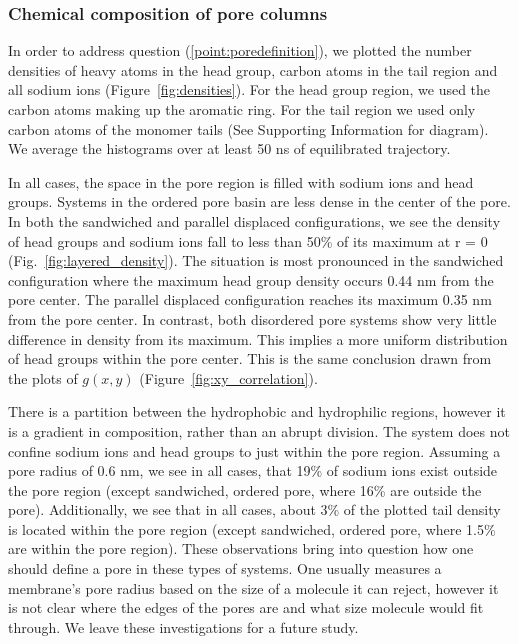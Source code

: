 \documentclass[journal=jpcbfk,manusciprt=article]{achemso}
\begin{document}
  \subsubsection{Chemical composition of pore columns}

  In order to address question (\ref{point:poredefinition}), we plotted the
  number densities of heavy atoms in the head group, carbon atoms in the tail
  region and all sodium ions (Figure~\ref{fig:densities}). For the head group
  region, we used the carbon atoms making up the aromatic ring. For the tail
  region we used only carbon atoms of the monomer tails (See Supporting
  Information for diagram). We average the histograms over at least 50 ns of
  equilibrated trajectory.
  
  In all cases, the space in the pore region is filled with sodium ions and
  head groups. Systems in the ordered pore basin are less dense in
  the center of the pore. In both the sandwiched and parallel displaced
  configurations, we see the density of head groups and sodium ions fall to less
  than 50\% of its maximum at r = 0 (Fig.~\ref{fig:layered_density}). The
  situation is most pronounced in the sandwiched configuration where the maximum
  head group density occurs 0.44 nm from the pore center. The parallel displaced
  configuration reaches its maximum 0.35 nm from the pore center. In contrast,
  both disordered pore systems show very little difference in density from its
  maximum. This implies a more uniform distribution of head groups within the
  pore center. This is the same conclusion drawn from the plots of $g(x,y)$ 
  (Figure~\ref{fig:xy_correlation}). 

  There is a partition between the hydrophobic and hydrophilic regions, however
  it is a gradient in composition, rather than an abrupt division. The system
  does not confine sodium ions and head groups to just within the pore region.
  Assuming a pore radius of 0.6 nm, we see in all cases, that 19\% of sodium ions
  exist outside the pore region (except sandwiched, ordered pore, where 16\%
  are outside the pore). Additionally, we see that in all cases, about 3\% of the
  plotted tail density is located within the pore region (except sandwiched,
  ordered pore, where 1.5\% are within the pore region). These observations bring
  into question how one should define a pore in these types of systems. One
  usually measures a membrane's pore radius based on the size of a molecule it
  can reject, however it is not clear where the edges of the pores are and what
  size molecule would fit through. We leave these investigations for a future
  study.
\end{document}
